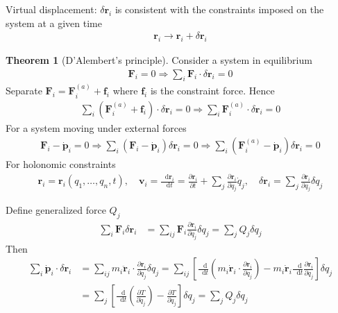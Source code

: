 \documentclass[twoside,9pt]{article}
\numberwithin{equation}{section} %
\newcommand{\lms}{\fontfamily{lmss}\selectfont} %
\renewcommand*\d{\mathop{}\!\mathrm{d}}
\theoremstyle{definition}
\newtheorem{theorem}{\lms Theorem}[section]
\theoremstyle{remark}
\begin{document}
Virtual displacement: $\delta\mathbf{r}_i$
is consistent with the constraints imposed on the system at
a given time
\begin{align}
    \mathbf{r}_i \rightarrow 
    \mathbf{r}_i + \delta\mathbf{r}_i
\end{align}
\begin{theorem}[D'Alembert's principle]
Consider a system in equilibrium
\begin{align}
    \mathbf{F}_i = 0
    \Rightarrow
    \sum_i\mathbf{F}_i\cdot\delta\mathbf{r}_i = 0
\end{align}
Separate $\mathbf{F}_i = \mathbf{F}_i^{(a)} + \mathbf{f}_i$
where $\mathbf{f}_i$ is the constraint force.
Hence
\begin{align}
    \sum_i(\mathbf{F}_i^{(a)} + \mathbf{f}_i)
    \cdot\delta\mathbf{r}_i = 0
    \Rightarrow
    \sum_i\mathbf{F}_i^{(a)}\cdot\delta\mathbf{r}_i = 0
\end{align}
For a system moving under external forces
\begin{align}
    \mathbf{F}_i - \dot{\mathbf{p}}_i = 0
    \Rightarrow
    \sum_i(\mathbf{F}_i - \dot{\mathbf{p}}_i)\delta\mathbf{r}_i = 0
    \Rightarrow
    \sum_i(\mathbf{F}_i^{(a)} - \dot{\mathbf{p}}_i)\delta\mathbf{r}_i = 0
\end{align}
For holonomic constraints
\begin{align}
    \mathbf{r}_i = \mathbf{r}_i(q_1,\dots,q_n,t),\quad
    \mathbf{v}_i = \frac{\d\mathbf{r}_i}{\d t}
    = \frac{\partial \mathbf{r}_i}{\partial t}
    + \sum_j\frac{\partial\mathbf{r}_i}{\partial q_j}\dot{q}_j,\quad
    \delta\mathbf{r}_i = \sum_j\frac{\partial\mathbf{r}_i}{\partial q_j}
    \delta q_j
\end{align}
\end{theorem}
Define generalized force $Q_j$
\begin{align}
    \sum_i\mathbf{F}_i\delta\mathbf{r}_i
    &= \sum_{ij}\mathbf{F}_i\frac{\partial\mathbf{r}_i}{\partial q_j}\delta q_j
    = \sum_j Q_j\delta q_j
\end{align}
Then
\begin{align}
    \sum_i\dot{\mathbf{p}}_i\cdot\delta\mathbf{r}_i
    &= \sum_{ij}m_i\ddot{\mathbf{r}}_i
    \cdot\frac{\partial \mathbf{r}_i}{\partial q_j}\delta q_j
    = 
    \sum_{ij}\left[
        \frac{\d}{\d t}
        \left(m_i\dot{\mathbf{r}}_i\cdot\frac{\partial\mathbf{r}_i}{\partial q_j}\right)
        - m_i\dot{\mathbf{r}}_i\frac{\d}{\d t}\frac{\partial\mathbf{r}_i}{\partial q_j}
    \right]\delta q_j\\
    &= 
    \sum_j\left[
        \frac{\d }{\d t}\left(\frac{\partial T}{\partial\dot{q}_j}\right)
        - \frac{\partial T}{\partial q_j}
    \right]\delta q_j
    = \sum_j Q_j\delta q_j\\
\end{align}
\end{document}

